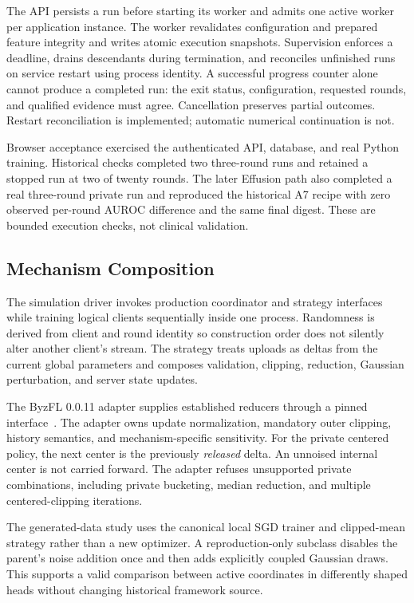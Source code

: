 \documentclass[conference,letterpaper]{IEEEtran}
\begin{document}
The API persists a run before starting its worker and admits one active worker per application instance. The worker revalidates configuration and prepared feature integrity and writes atomic execution snapshots. Supervision enforces a deadline, drains descendants during termination, and reconciles unfinished runs on service restart using process identity. A successful progress counter alone cannot produce a completed run: the exit status, configuration, requested rounds, and qualified evidence must agree. Cancellation preserves partial outcomes. Restart reconciliation is implemented; automatic numerical continuation is not.

Browser acceptance exercised the authenticated API, database, and real Python training. Historical checks completed two three-round runs and retained a stopped run at two of twenty rounds. The later Effusion path also completed a real three-round private run and reproduced the historical A7 recipe with zero observed per-round AUROC difference and the same final digest. These are bounded execution checks, not clinical validation.

\subsection{Mechanism Composition}
The simulation driver invokes production coordinator and strategy interfaces while training logical clients sequentially inside one process. Randomness is derived from client and round identity so construction order does not silently alter another client's stream. The strategy treats uploads as deltas from the current global parameters and composes validation, clipping, reduction, Gaussian perturbation, and server state updates.

The ByzFL 0.0.11 adapter supplies established reducers through a pinned interface~\cite{byzfl}. The adapter owns update normalization, mandatory outer clipping, history semantics, and mechanism-specific sensitivity. For the private centered policy, the next center is the previously \emph{released} delta. An unnoised internal center is not carried forward. The adapter refuses unsupported private combinations, including private bucketing, median reduction, and multiple centered-clipping iterations.

The generated-data study uses the canonical local SGD trainer and clipped-mean strategy rather than a new optimizer. A reproduction-only subclass disables the parent's noise addition once and then adds explicitly coupled Gaussian draws. This supports a valid comparison between active coordinates in differently shaped heads without changing historical framework source.
\end{document}

